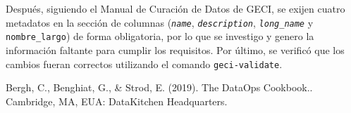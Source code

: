 \documentclass{article}
\begin{document}
    Después, siguiendo el Manual de Curación de Datos de GECI, se exijen cuatro metadatos en la sección de columnas (\texttt{\textsl{name}}, \texttt{\textsl{description}}, \texttt{\textsl{long\_name}} y \texttt{nombre\_largo}) de forma obligatoria, por lo que se investigo y genero la información faltante para cumplir los requisitos. Por último, se verificó que los cambios fueran correctos utilizando el comando \texttt{geci-validate}.
\begin{thebibliography}{1} 
 Bergh, C., Benghiat, G., \& Strod, E. (2019). The DataOps Cookbook.. Cambridge, MA, EUA: DataKitchen Headquarters.
\end{thebibliography}
\end{document}

